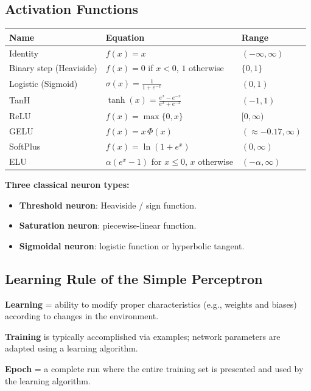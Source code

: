 \documentclass[11pt,a4paper]{article}
\begin{document}
\subsection{Activation Functions}

\begin{center}
\begin{tabular}{lll}
\toprule
\textbf{Name} & \textbf{Equation} & \textbf{Range} \\
\midrule
Identity & $f(x) = x$ & $(-\infty,\infty)$ \\
Binary step (Heaviside) & $f(x)= 0$ if $x<0$, $1$ otherwise & $\{0,1\}$ \\
Logistic (Sigmoid) & $\sigma(x) = \frac{1}{1+e^{-x}}$ & $(0,1)$ \\
TanH & $\tanh(x) = \frac{e^x - e^{-x}}{e^x + e^{-x}}$ & $(-1,1)$ \\
ReLU & $f(x) = \max\{0, x\}$ & $[0,\infty)$ \\
GELU & $f(x) = x\,\Phi(x)$ & $(\approx-0.17,\infty)$ \\
SoftPlus & $f(x) = \ln(1+e^x)$ & $(0,\infty)$ \\
ELU & $\alpha(e^x-1)$ for $x\le0$, $x$ otherwise & $(-\alpha, \infty)$ \\
\bottomrule
\end{tabular}
\end{center}

\textbf{Three classical neuron types:}
\begin{itemize}[leftmargin=*]
    \item \textbf{Threshold neuron}: Heaviside / sign function.
    \item \textbf{Saturation neuron}: piecewise-linear function.
    \item \textbf{Sigmoidal neuron}: logistic function or hyperbolic tangent.
\end{itemize}

\subsection{Learning Rule of the Simple Perceptron}

\begin{definitionbox}[title=Learning vs. Training]
\textbf{Learning} = ability to modify proper characteristics (e.g., weights and biases) according to changes in the environment.

\textbf{Training} is typically accomplished via examples; network parameters are adapted using a learning algorithm.

\textbf{Epoch} = a complete run where the entire training set is presented and used by the learning algorithm.
\end{definitionbox}
\end{document}
